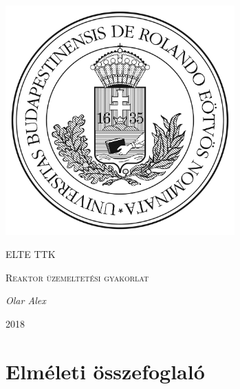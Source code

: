 \documentclass[a4paper,12pt]{article}
\begin{document}
\linespread{1.2}

\begin{titlepage}

	\centering
	\includegraphics[width=0.66\textwidth]{elte.jpg}\par\vspace{1cm}
	{\scshape\LARGE ELTE TTK \par}
	\vspace{3cm}
	{\scshape\Large Reaktor üzemeltetési gyakorlat\par}
	\vspace{1cm}
	{\large\itshape Olar Alex\par}
	\vspace{3cm}
	{\large 2018 \par}
	
\end{titlepage}

\begin{abstract}
\par A mérés célja az volt, hogy megismerkedjünk a reaktor üzemeltetéshez szükséges berendezésekkel. Ezek közé tartoznak a biztonságért felelős és mérő műszerek is. A gyakorlat során elindítottuk az önfenntartó láncreakciót és kritikussá tettük a reaktort, valamint vészleállást is kiviteleztünk.
\end{abstract}

\vfill

\tableofcontents

\newpage

\section{Elméleti összefoglaló}
\end{document}
